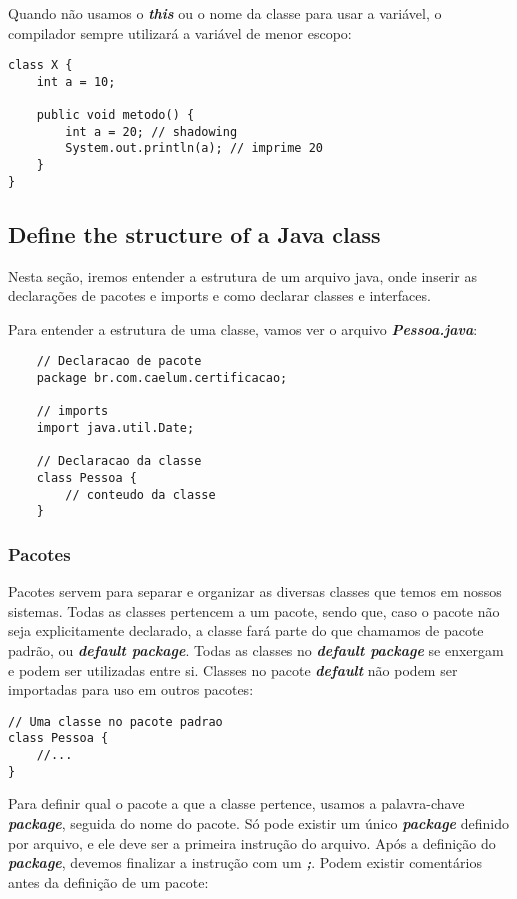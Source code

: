 \documentclass[12pt]{report}
\begin{document}
Quando não usamos o \textbf{\textit{this}} ou o nome da classe para usar a variável, o compilador sempre utilizará a variável de menor escopo:

\begin{lstlisting}
class X {
	int a = 10;
	
	public void metodo() {
		int a = 20; // shadowing
		System.out.println(a); // imprime 20
	}
}
\end{lstlisting}



\subsection*{Define the structure of a Java class}

Nesta seção, iremos entender a estrutura de um arquivo java, onde inserir as declarações de pacotes e imports e como declarar classes e interfaces.

Para entender a estrutura de uma classe, vamos ver o arquivo \textbf{\textit{Pessoa.java}}:

\begin{lstlisting}
	// Declaracao de pacote
	package br.com.caelum.certificacao;
	
	// imports
	import java.util.Date;
	
	// Declaracao da classe
	class Pessoa {
		// conteudo da classe
	}
\end{lstlisting}

\subsubsection{Pacotes}

Pacotes servem para separar e organizar as diversas classes que temos em nossos sistemas. Todas as classes pertencem a um pacote, sendo que, caso o pacote não seja explicitamente declarado, a classe fará parte do que chamamos de pacote padrão, ou \textbf{\textit{default package}}. Todas as classes no \textbf{\textit{default package}} se enxergam e podem ser utilizadas entre si. Classes no pacote \textbf{\textit{default}} não podem ser importadas para uso em outros pacotes:

\begin{lstlisting}
// Uma classe no pacote padrao
class Pessoa {
	//...
}
\end{lstlisting}

Para definir qual o pacote a que a classe pertence, usamos a palavra-chave \textbf{\textit{package}}, seguida do nome do pacote. Só pode existir um único \textbf{\textit{package}} definido por arquivo, e ele deve ser a primeira instrução do arquivo. Após a definição do \textbf{\textit{package}}, devemos finalizar a instrução com um \textbf{\textit{;}}. Podem existir comentários antes da definição de um pacote:
\end{document}
